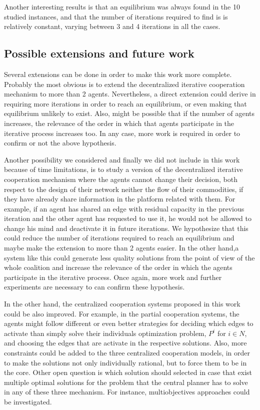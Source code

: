 \documentclass{article}
\begin{document}
Another interesting results is that an equilibrium was always found in the 10 studied instances, and that the number of iterations required to find is is relatively constant, varying between 3 and 4 iterations in all the cases.

\subsection{Possible extensions and future work}

Several extensions can be done in order to make this work more complete. Probably the most obvious is to extend the decentralized iterative cooperation mechanism to more than 2 agents. Nevertheless, a direct extension could derive in requiring more iterations in order to reach an equilibrium, or even making that equilibrium unlikely to exist. Also, might be possible that if the number of agents increases, the relevance of the order in which that agents participate in the iterative process increases too. In any case, more work is required in order to confirm or not the above hypothesis.

Another possibility we considered and finally we did not include in this work because of time limitations, is to study a version of the 
decentralized iterative cooperation mechanism where the agents cannot change their decision, both respect to the design of their network neither the flow of their commodities, if they have already share information in the platform related with them. For example, if an agent has shared an edge with residual capacity in the previous iteration and the other agent has requested to use it, he would not be allowed to change his mind and deactivate it in future iterations. We hypothesize that this could reduce the number of iterations required  to reach an equilibrium and maybe make the extension to more than 2 agents easier. In the other hand,a system like this could generate less quality solutions from the point of view of the whole coalition and increase the relevance of the order in which the agents participate in the iterative process. Once again, more work and further experiments are necessary to can confirm these hypothesis.

In the other hand, the centralized cooperation systems proposed in this work could be also improved. For example, in the partial cooperation systems, the agents might follow different or even better strategies for deciding which edges to activate than simply solve their individuals optimization problem, $P^i$ for $i\in N$, and choosing the edges that are activate in the respective solutions. Also, more constraints could be added to the three centralized cooperation models, in order to make the solutions not only individually rational, but to force them to be in the core. Other open question is which solution should selected in case that exist multiple optimal solutions for the problem that the central planner has to solve in any of these three mechanism. For instance, multiobjectives approaches could be investigated.
\end{document}
